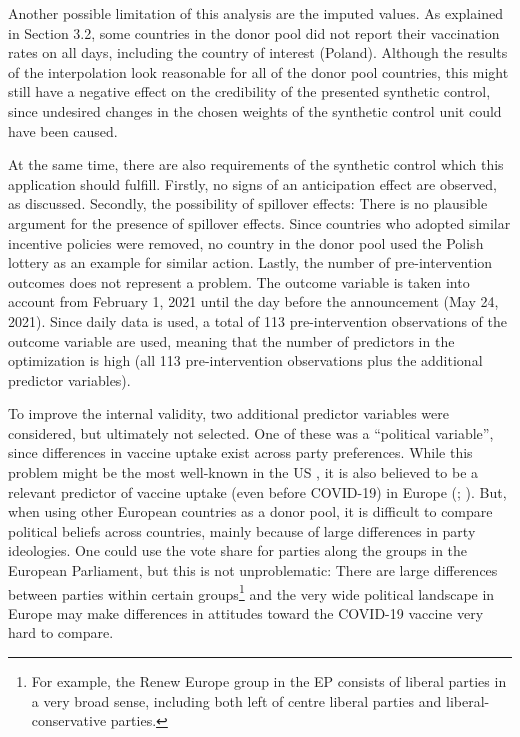 \documentclass{scrbook}
\begin{document}
Another possible limitation of this analysis are the imputed values. As
explained in Section 3.2, some countries in the donor pool did not
report their vaccination rates on all days, including the country of
interest (Poland). Although the results of the interpolation look
reasonable for all of the donor pool countries, this might still have a
negative effect on the credibility of the presented synthetic control,
since undesired changes in the chosen weights of the synthetic control
unit could have been caused.

At the same time, there are also requirements of the synthetic control
which this application should fulfill. Firstly, no signs of an
anticipation effect are observed, as discussed. Secondly, the
possibility of spillover effects: There is no plausible argument for the
presence of spillover effects. Since countries who adopted similar
incentive policies were removed, no country in the donor pool used the
Polish lottery as an example for similar action. Lastly, the number of
pre-intervention outcomes does not represent a problem. The outcome
variable is taken into account from February 1, 2021 until the day
before the announcement (May 24, 2021). Since daily data is used, a
total of 113 pre-intervention observations of the outcome variable are
used, meaning that the number of predictors in the optimization is high
(all 113 pre-intervention observations plus the additional predictor
variables).

To improve the internal validity, two additional predictor variables
were considered, but ultimately not selected. One of these was a
``political variable'', since differences in vaccine uptake exist across
party preferences. While this problem might be the most well-known in
the US \parencite{ruiz_predictors_2021}, it is also believed to be a
relevant predictor of vaccine uptake (even before COVID-19) in Europe
(\cite{schernhammer_correlates_2022}; \cite{kennedy_populist_2019}).
But, when using other European countries as a donor pool, it is
difficult to compare political beliefs across countries, mainly because
of large differences in party ideologies. One could use the vote share
for parties along the groups in the European Parliament, but this is not
unproblematic: There are large differences between parties within
certain
groups\footnote{For example, the Renew Europe group in the EP consists of liberal parties in a very broad sense, including both left of centre liberal parties and liberal-conservative parties.}
and the very wide political landscape in Europe may make differences in
attitudes toward the COVID-19 vaccine very hard to compare.
\end{document}
